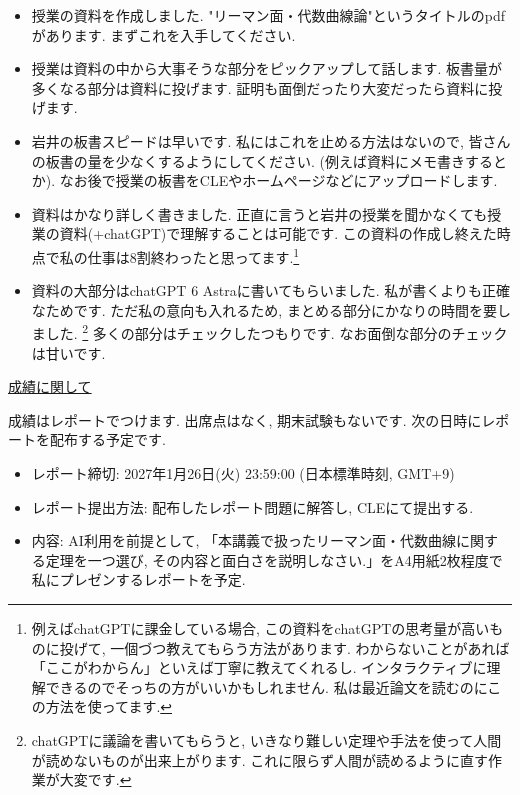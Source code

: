 \documentclass[dvipdfmx,a4paper,11pt]{article} %
\theoremstyle{definition}
\numberwithin{equation}{section}
\begin{document}
\begin{itemize}
  \setlength{\parskip}{0pt} 
  \setlength{\itemsep}{0cm}
\item 授業の資料を作成しました. "リーマン面・代数曲線論"というタイトルのpdfがあります. まずこれを入手してください. 
\item 授業は資料の中から大事そうな部分をピックアップして話します. 板書量が多くなる部分は資料に投げます. 証明も面倒だったり大変だったら資料に投げます. 
\item 岩井の板書スピードは早いです. 私にはこれを止める方法はないので, 皆さんの板書の量を少なくするようにしてください. (例えば資料にメモ書きするとか). なお後で授業の板書をCLEやホームページなどにアップロードします.
\item 資料はかなり詳しく書きました. 正直に言うと岩井の授業を聞かなくても授業の資料(+chatGPT)で理解することは可能です. この資料の作成し終えた時点で私の仕事は8割終わったと思ってます.\footnote{例えばchatGPTに課金している場合, この資料をchatGPTの思考量が高いものに投げて, 一個づつ教えてもらう方法があります. わからないことがあれば「ここがわからん」といえば丁寧に教えてくれるし. インタラクティブに理解できるのでそっちの方がいいかもしれません. 私は最近論文を読むのにこの方法を使ってます. }
\item 資料の大部分はchatGPT 6 Astraに書いてもらいました. 私が書くよりも正確なためです. ただ私の意向も入れるため, まとめる部分にかなりの時間を要しました. \footnote{chatGPTに議論を書いてもらうと, いきなり難しい定理や手法を使って人間が読めないものが出来上がります. これに限らず人間が読めるように直す作業が大変です. } 多くの部分はチェックしたつもりです. なお面倒な部分のチェックは甘いです. 
\end{itemize}

\newpage

{\Large \underline{成績に関して}}

成績はレポートでつけます. 出席点はなく, 期末試験もないです. 
次の日時にレポートを配布する予定です.
\begin{itemize}
  \setlength{\parskip}{0cm} 
  \setlength{\itemsep}{0cm}
\item レポート締切: 2027年1月26日(火) 23:59:00 (日本標準時刻, GMT+9)
\item レポート提出方法: 配布したレポート問題に解答し, CLEにて提出する.
\item 内容: AI利用を前提として, 「本講義で扱ったリーマン面・代数曲線に関する定理を一つ選び, その内容と面白さを説明しなさい.」をA4用紙2枚程度で私にプレゼンするレポートを予定.
\end{itemize}
\end{document}
